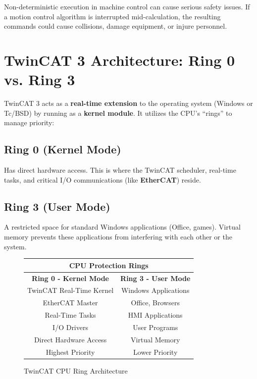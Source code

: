 \documentclass[11pt,a4paper]{article}
\begin{document}
\begin{warningbox}
Non-deterministic execution in machine control can cause serious safety issues. If a motion control algorithm is interrupted mid-calculation, the resulting commands could cause collisions, damage equipment, or injure personnel.
\end{warningbox}

\section{TwinCAT 3 Architecture: Ring 0 vs. Ring 3}

TwinCAT 3 acts as a \textbf{real-time extension} to the operating system (Windows or Tc/BSD) by running as a \textbf{kernel module}. It utilizes the CPU's ``rings'' to manage priority:

\subsection{Ring 0 (Kernel Mode)}

Has direct hardware access. This is where the TwinCAT scheduler, real-time tasks, and critical I/O communications (like \textbf{EtherCAT}) reside.

\subsection{Ring 3 (User Mode)}

A restricted space for standard Windows applications (Office, games). Virtual memory prevents these applications from interfering with each other or the system.

\begin{figure}[h]
\centering
\begin{tabular}{|c|c|}
\hline
\multicolumn{2}{|c|}{\textbf{CPU Protection Rings}} \\
\hline
\textbf{Ring 0 - Kernel Mode} & \textbf{Ring 3 - User Mode} \\
\hline
TwinCAT Real-Time Kernel & Windows Applications \\
EtherCAT Master & Office, Browsers \\
Real-Time Tasks & HMI Applications \\
I/O Drivers & User Programs \\
\hline
Direct Hardware Access & Virtual Memory \\
Highest Priority & Lower Priority \\
\hline
\end{tabular}
\caption{TwinCAT CPU Ring Architecture}
\end{figure}
\end{document}
